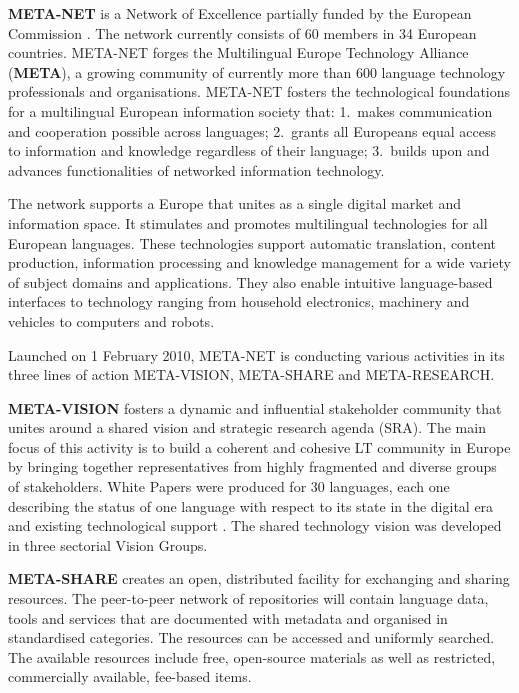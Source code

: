 \documentclass[10pt, plain]{../../metanetpaper}
\begin{document}
\begin{multicols}{2}
  \textbf{META-NET} is a Network of Excellence partially funded by the European Commission \cite{rehm2011}.  The network currently consists of 60 members in 34 European countries. META-NET forges the Multilingual Europe Technology Alliance (\textbf{META}), a growing community of currently more than 600 language technology professionals and organisations. META-NET fosters the technological foundations for a multilingual European information society that: 1.~makes communication and cooperation possible across languages; 2.~grants all Europeans equal access to information and knowledge regardless of their language; 3.~builds upon and advances functionalities of networked information technology.

The network supports a Europe that unites as a single digital market and information space. It stimulates and promotes multilingual technologies for all European languages. These technologies support automatic translation, content production, information processing and knowledge management for a wide variety of subject domains and applications. They also enable intuitive language-based interfaces to technology ranging from household electronics, machinery and vehicles to computers and robots.

Launched on 1 February 2010, META-NET is conducting various activities in its three lines of action META-VISION, META-SHARE and META-RESEARCH.

\textbf{META-VISION} fosters a dynamic and influential stakeholder community that unites around a shared vision and strategic research agenda (SRA). The main focus of this activity is to build a coherent and cohesive LT community in Europe by bringing together representatives from highly fragmented and diverse groups of stakeholders. White Papers were produced for 30 languages, each one describing the status of one language with respect to its state in the digital era and existing technological support \cite{LWP2012}. The shared technology vision was developed in three sectorial Vision Groups. 

\textbf{META-SHARE} creates an open, distributed facility for exchanging and sharing resources. The peer-to-peer network of repositories will contain language data, tools and services that are documented with metadata and organised in standardised categories. The resources can be accessed and uniformly searched. The available resources include free, open-source materials as well as restricted, commercially available, fee-based items.  


\end{multicols}
\end{document}
